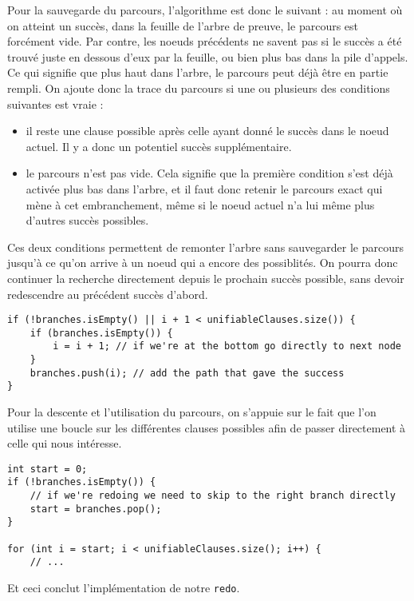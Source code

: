 \documentclass[../report.tex]{subfiles}
\begin{document}
Pour la sauvegarde du parcours, l'algorithme est donc le suivant : au moment où on atteint un succès, dans la feuille de l'arbre de preuve, le parcours est forcément vide. Par contre, les noeuds précédents ne savent pas si le succès a été trouvé juste en dessous d'eux par la feuille, ou bien plus bas dans la pile d'appels. Ce qui signifie que plus haut dans l'arbre, le parcours peut déjà être en partie rempli. On ajoute donc la trace du parcours si une ou plusieurs des conditions suivantes est vraie :
\begin{itemize}
    \item il reste une clause possible après celle ayant donné le succès dans le noeud actuel. Il y a donc un potentiel succès supplémentaire.
    \item le parcours n'est pas vide. Cela signifie que la première condition s'est déjà activée plus bas dans l'arbre, et il faut donc retenir le parcours exact qui mène à cet embranchement, même si le noeud actuel n'a lui même plus d'autres succès possibles.
\end{itemize}
Ces deux conditions permettent de remonter l'arbre sans sauvegarder le parcours jusqu'à ce qu'on arrive à un noeud qui a encore des possiblités. On pourra donc continuer la recherche directement depuis le prochain succès possible, sans devoir redescendre au précédent succès d'abord.
\begin{verbatim}
if (!branches.isEmpty() || i + 1 < unifiableClauses.size()) {
    if (branches.isEmpty()) {
        i = i + 1; // if we're at the bottom go directly to next node
    }
    branches.push(i); // add the path that gave the success
}
\end{verbatim}
Pour la descente et l'utilisation du parcours, on s'appuie sur le fait que l'on utilise une boucle sur les différentes clauses possibles afin de passer directement à celle qui nous intéresse.
\begin{verbatim}
int start = 0;
if (!branches.isEmpty()) {
    // if we're redoing we need to skip to the right branch directly
    start = branches.pop();
}

for (int i = start; i < unifiableClauses.size(); i++) {
    // ...
\end{verbatim}
Et ceci conclut l'implémentation de notre \texttt{redo}.
\end{document}
